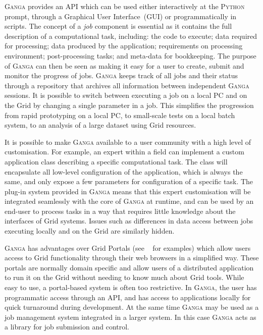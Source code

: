 \documentclass{elsart}
\def\ganga {\textsc{Ganga}\xspace}
\def\python {\textsc{Python}\xspace}
\def\grid {Grid\xspace}
\begin{document}
\ganga provides an API which can be used either interactively at the \python
prompt, through a Graphical User Interface~(GUI) or programmatically in
scripts. The concept of a \emph{job} component is essential as it contains the
full description of a computational task, including: the code to execute; data
required for processing; data produced by the application; requirements on
processing environment; post-processing tasks; and meta-data for bookkeeping.
The purpose of \ganga can then be seen as making it easy for a user to create,
submit and monitor the progress of jobs. \ganga keeps track of all jobs and
their status through a repository that archives all information between
independent \ganga sessions. It is possible to switch between executing a job
on a local PC and on the \grid by changing a single parameter in a job. This
simplifies the progression from rapid prototyping on a local PC, to
small-scale tests on a local batch system, to an analysis of a large dataset
using \grid resources.

It is possible to make \ganga available to a user community with a high level
of customisation. For example, an expert within a field can implement a custom
application class describing a specific computational task. The class will
encapsulate all low-level configuration of the application, which is always
the same, and only expose a few parameters for configuration of a specific
task. The plug-in system provided in \ganga means that this expert
customisation will be integrated seamlessly with the core of \ganga at runtime,
and can be used by an end-user to process tasks in a way that requires
little knowledge about the interfaces of \grid systems. Issues such as
differences in data access between jobs executing locally and on the
\grid are similarly hidden.

\ganga has advantages over \grid Portals (see ~\cite{AHE,LEAD} for examples)
which allow users access to \grid functionality through their web browsers in
a simplified way. These portals are normally domain specific and allow users
of a distributed application to run it on the \grid without needing to know
much about \grid tools. While easy to use, a portal-based system is often too
restrictive.  In \ganga, the user has programmatic access through an API, and
has access to applications locally for quick turnaround during development. At
the same time \ganga may be used as a job management system integrated in a
larger system. In this case \ganga acts as a library for job submission and
control.
\end{document}
